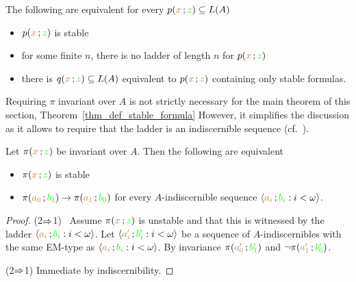 \begin{fact}\label{}
  The following are equivalent for every $p({\color{brown} x}\,;{\color{green} z})\subseteq L(A)$
  \begin{itemize}
    \item [1.] $p({\color{brown} x}\,;{\color{green} z})$ is stable
    \item [1.] for some finite $n$, there is no ladder of length $n$ for $p({\color{brown} x}\,;{\color{green} z})$
    \item [2.] there is $q({\color{brown} x}\,;{\color{green} z})\subseteq L(A)$ equivalent to $p({\color{brown} x}\,;{\color{green} z})$ containing only stable formulas.
  \end{itemize}
\end{fact}

Requiring $\pi$ invariant over $A$ is not strictly necessary for the main theorem of this section, Theorem~\ref{thm_def_stable_formula}
However, it simplifies the discussion as it allows to require that the ladder is an indiscernible sequence (cf.~). 

\begin{theorem}\label{thm_sability_indiscernibility}
  Let $\pi({\color{brown} x}\,;{\color{green} z})$ be invariant over $A$.
  Then the following are equivalent
  \begin{itemize}
    \item[1.] $\pi({\color{brown} x}\,;{\color{green} z})$ is stable
    \item[2.] $\pi({\color{brown} a_0}\,;{\color{green} b_1})\rightarrow\pi({\color{brown} a_1}\,;{\color{green} b_0})$ for every $A$-indiscernible sequence $\langle{\color{brown}a_i}\,;{\color{green} b_i} : i<\omega\rangle$.
  \end{itemize}
\end{theorem}

\begin{proof}
  (2$\Rightarrow$1) \ Assume $\pi({\color{brown} x}\,;{\color{green} z})$ is unstable and that this is witnessed by the ladder $\langle{\color{brown}a_i}\,;{\color{green} b_i} : i<\omega\rangle$.
  Let $\langle{\color{brown}a'_i}\,;{\color{green} b'_i} : i<\omega\rangle$ be a sequence of $A$-indiscernibles with the same EM-type as $\langle{\color{brown}a_i}\,;{\color{green} b_i} : i<\omega\rangle$.
  By invariance $\pi({\color{brown} a'_0}\,;{\color{green} b'_1})$ and $\neg\pi({\color{brown} a'_1}\,;{\color{green} b'_0})$.

  (2$\Rightarrow$1) Immediate by indiscernibility.
\end{proof}


